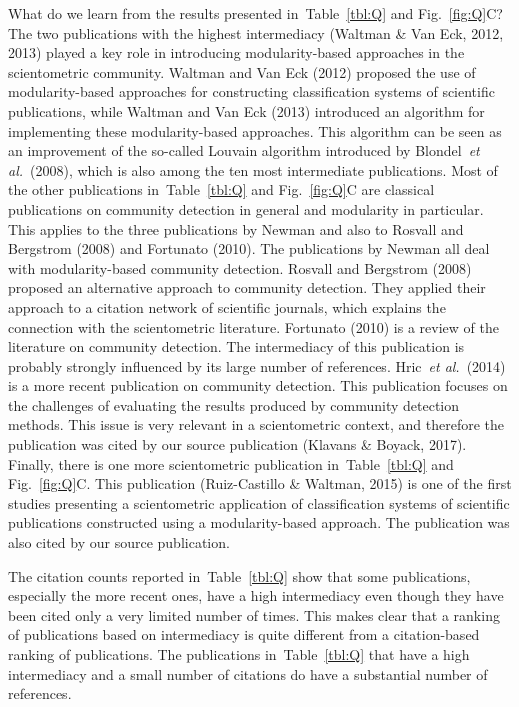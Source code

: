 \documentclass[9pt,twocolumn,twoside,lineno]{pnas-alt}
\theoremstyle{definition}
\newcommand{\subfigref}[2]{Fig.~\ref{fig:#1}#2\xspace}
\newcommand{\tblref}[1]{Table~\ref{tbl:#1}\xspace}
\renewcommand{\etal}{~\emph{et al.}\xspace}
\begin{document}
What do we learn from the results presented in~\tblref{Q} and \subfigref{Q}{C}? The two publications with the highest intermediacy (Waltman \& Van Eck, 2012, 2013) played a key role in introducing modularity-based approaches in the scientometric community. Waltman and Van Eck (2012) proposed the use of modularity-based approaches for constructing classification systems of scientific publications, while Waltman and Van Eck (2013) introduced an algorithm for implementing these modularity-based approaches. This algorithm can be seen as an improvement of the so-called Louvain algorithm introduced by Blondel\etal~(2008), which is also among the ten most intermediate publications. Most of the other publications in~\tblref{Q} and \subfigref{Q}{C} are classical publications on community detection in general and modularity in particular. This applies to the three publications by Newman and also to Rosvall and Bergstrom (2008) and Fortunato (2010). The publications by Newman all deal with modularity-based community detection. Rosvall and Bergstrom (2008) proposed an alternative approach to community detection. They applied their approach to a citation network of scientific journals, which explains the connection with the scientometric literature. Fortunato (2010) is a review of the literature on community detection. The intermediacy of this publication is probably strongly influenced by its large number of references. Hric\etal~(2014) is a more recent publication on community detection. This publication focuses on the challenges of evaluating the results produced by community detection methods. This issue is very relevant in a scientometric context, and therefore the publication was cited by our source publication (Klavans \& Boyack, 2017). Finally, there is one more scientometric publication in~\tblref{Q} and \subfigref{Q}{C}. This publication (Ruiz-Castillo \& Waltman, 2015) is one of the first studies presenting a scientometric application of classification systems of scientific publications constructed using a modularity-based approach. The publication was also cited by our source publication.

The citation counts reported in~\tblref{Q} show that some publications, especially the more recent ones, have a high intermediacy even though they have been cited only a very limited number of times. This makes clear that a ranking of publications based on intermediacy is quite different from a citation-based ranking of publications. The publications in~\tblref{Q} that have a high intermediacy and a small number of citations do have a substantial number of references.
\end{document}
